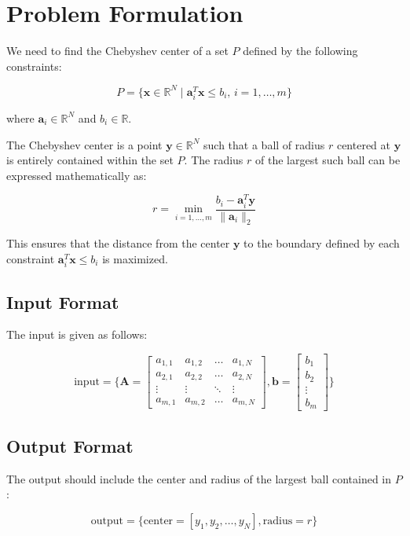 \documentclass{article}
\begin{document}
\section*{Problem Formulation}

We need to find the Chebyshev center of a set \(P\) defined by the following constraints:

\[
P = \{ \mathbf{x} \in \mathbb{R}^N \mid \mathbf{a}_i^T \mathbf{x} \leq b_i, \, i = 1, \ldots, m \}
\]

where \(\mathbf{a}_i \in \mathbb{R}^N\) and \(b_i \in \mathbb{R}\).

The Chebyshev center is a point \(\mathbf{y} \in \mathbb{R}^N\) such that a ball of radius \(r\) centered at \(\mathbf{y}\) is entirely contained within the set \(P\). The radius \(r\) of the largest such ball can be expressed mathematically as:

\[
r = \min_{i=1, \ldots, m} \frac{b_i - \mathbf{a}_i^T \mathbf{y}}{\|\mathbf{a}_i\|_2}
\]

This ensures that the distance from the center \(\mathbf{y}\) to the boundary defined by each constraint \(\mathbf{a}_i^T \mathbf{x} \leq b_i\) is maximized.

\subsection*{Input Format}

The input is given as follows:

\[
\text{input} = \{
    \mathbf{A} = \begin{bmatrix}
    a_{1,1} & a_{1,2} & \ldots & a_{1,N} \\
    a_{2,1} & a_{2,2} & \ldots & a_{2,N} \\
    \vdots & \vdots & \ddots & \vdots \\
    a_{m,1} & a_{m,2} & \ldots & a_{m,N}
    \end{bmatrix},
    \mathbf{b} = \begin{bmatrix}
    b_1 \\
    b_2 \\
    \vdots \\
    b_m
    \end{bmatrix}
\}
\]

\subsection*{Output Format}

The output should include the center and radius of the largest ball contained in \(P\):

\[
\text{output} = \{
    \text{center} = [y_1, y_2, \ldots, y_N],
    \text{radius} = r
\}
\]
\end{document}

